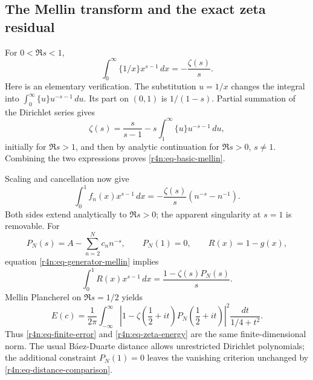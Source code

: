 \documentclass[11pt,a4paper]{article}
\theoremstyle{definition}\newtheorem{definition}[theorem]{Definition}
\theoremstyle{remark}\newtheorem{remark}[theorem]{Remark}
\numberwithin{equation}{section}
\begin{document}
\subsection{The Mellin transform and the exact zeta residual}
\label{r4n:subsec-mellin}

For $0<\Re s<1$,
\begin{equation}
\label{r4n:eq-basic-mellin}
 \int_0^\infty\{1/x\}x^{s-1}\,dx=-\frac{\zeta(s)}s.
\end{equation}
Here is an elementary verification.
The substitution $u=1/x$ changes the integral into
$\int_0^\infty\{u\}u^{-s-1}\,du$.
Its part on $(0,1)$ is $1/(1-s)$.
Partial summation of the Dirichlet series gives
\[
 \zeta(s)=\frac{s}{s-1}
           -s\int_1^\infty\{u\}u^{-s-1}\,du,
\]
initially for $\Re s>1$, and then by analytic continuation for
$\Re s>0$, $s\ne1$.  Combining the two expressions proves
\eqref{r4n:eq-basic-mellin}.

Scaling and cancellation now give
\begin{equation}
\label{r4n:eq-generator-mellin}
 \int_0^1f_n(x)x^{s-1}\,dx
 =-\frac{\zeta(s)}s(n^{-s}-n^{-1}).
\end{equation}
Both sides extend analytically to $\Re s>0$; the apparent
singularity at $s=1$ is removable.
For
\[
 P_N(s)=A-\sum_{n=2}^Nc_nn^{-s},\qquad P_N(1)=0,\qquad R(x)=1-g(x),
\]
equation \eqref{r4n:eq-generator-mellin} implies
\begin{equation}
\label{r4n:eq-residual-mellin}
 \int_0^1R(x)x^{s-1}\,dx=\frac{1-\zeta(s)P_N(s)}s.
\end{equation}
Mellin Plancherel on $\Re s=1/2$ yields
\begin{equation}
\label{r4n:eq-zeta-energy}
 E(c)=\frac1{2\pi}\int_{-\infty}^{\infty}
 \left|1-\zeta\left(\frac12+it\right)
                P_N\left(\frac12+it\right)\right|^2
              \frac{dt}{1/4+t^2}.
\end{equation}
Thus \eqref{r4n:eq-finite-error} and \eqref{r4n:eq-zeta-energy}
are the same finite-dimensional norm.
The usual B\'aez-Duarte distance allows unrestricted Dirichlet
polynomials; the additional constraint $P_N(1)=0$ leaves the
vanishing criterion unchanged by
\eqref{r4n:eq-distance-comparison}.
\end{document}
